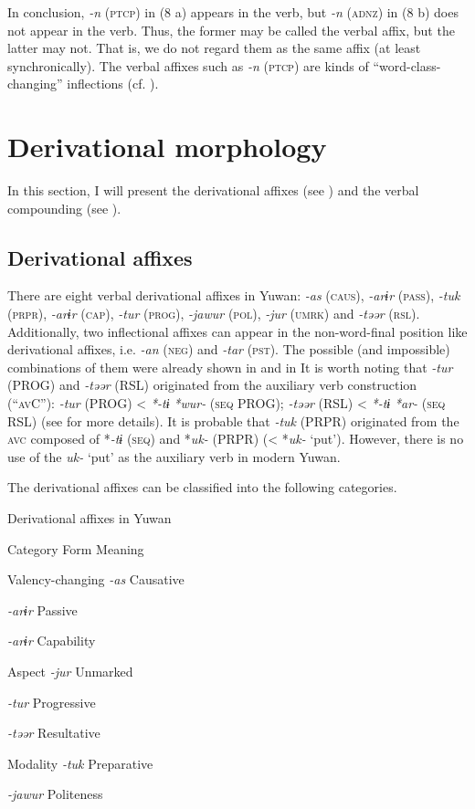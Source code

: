   In conclusion, \textit{-n} (\textsc{ptcp}) in (8 a) appears in the verb, but \textit{-n} (\textsc{adnz}) in (8 b) does not appear in the verb. Thus, the former may be called the verbal affix, but the latter may not. That is, we do not regard them as the same affix (at least synchronically). The verbal affixes such as \textit{-n} (\textsc{ptcp}) are kinds of “word-class-changing” inflections (cf. \citealt{Haspelmath1996}).

\section{Derivational morphology}

In this section, I will present the derivational affixes (see ) and the verbal compounding (see ).

\subsection{Derivational affixes}

There are eight verbal derivational affixes in Yuwan: \textit{-as} (\textsc{caus}), \textit{-arɨr} (\textsc{pass}), \textit{-tuk} (\textsc{prpr}), \textit{-arɨr} (\textsc{cap}), \textit{-tur} (\textsc{prog}), \textit{-jawur} (\textsc{pol}), \textit{-jur} (\textsc{umrk}) and \textit{-təər} (\textsc{rsl}). Additionally, two inflectional affixes can appear in the non-word-final position like derivational affixes, i.e. \textit{-an} (\textsc{neg}) and \textit{-tar} (\textsc{pst}). The possible (and impossible) combinations of them were already shown in  and  in  It is worth noting that \textit{-tur} (PROG) and \textit{-təər} (RSL) originated from the auxiliary verb construction (“\textsc{av}C”): \textit{-tur} (PROG) < \textit{*-tɨ} \textit{*wur-} (\textsc{seq} PROG); \textit{-təər} (RSL) < \textit{*-tɨ} \textit{*ar-} (\textsc{seq} RSL) (see  for more details). It is probable that \textit{-tuk} (PRPR) originated from the \textsc{avc} composed of *\textit{-tɨ} (\textsc{seq}) and *\textit{uk-} (PRPR) (< *\textit{uk-} ‘put’). However, there is no use of the \textit{uk-} ‘put’ as the auxiliary verb in modern Yuwan.

  The derivational affixes can be classified into the following categories.

\begin{table}
\caption{\label{tab:key:84}Derivational affixes in Yuwan}

Category  Form  Meaning

Valency-changing  \textit{-as} Causative

  \textit{-arɨr} Passive

  \textit{-arɨr} Capability

Aspect  \textit{-jur} Unmarked

  \textit{-tur} Progressive

  \textit{-təər} Resultative

Modality  \textit{-tuk} Preparative

  \textit{-jawur} Politeness
\end{table}

